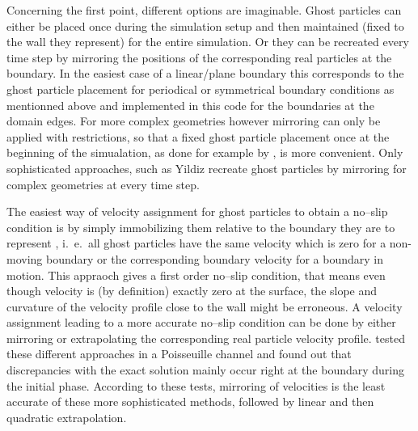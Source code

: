 \documentclass{report}
\begin{document}
Concerning the first point, different options are imaginable. Ghost particles can either be placed once during the simulation setup and then maintained (fixed to the wall they represent) for the entire simulation. Or they can be recreated every time step by mirroring the positions of the corresponding real particles at the boundary. In the easiest case of a linear/plane boundary this corresponds to the ghost particle placement for periodical or symmetrical boundary conditions as mentionned above and implemented in this code for the boundaries at the domain edges.
For more complex geometries however mirroring can only be applied with restrictions, so that a fixed ghost particle placement once at the beginning of the simualation, as done for example by \cite{Morris1997, Zhu1999}, is more convenient. Only sophisticated approaches, such as Yildiz \cite{Yildiz2009} recreate ghost particles by mirroring for complex geometries at every time step.

The easiest way of velocity assignment for ghost particles to obtain a no--slip condition is by simply immobilizing them relative to the boundary they are to represent \cite{Morris1997}, i.\ e.\ all ghost particles have the same velocity which is zero for a non-moving boundary or the corresponding boundary velocity for a boundary in motion. This appraoch gives a first order 
no--slip condition, that means even though velocity is (by definition) exactly zero at the surface, the slope and curvature of the velocity profile close to the wall might be erroneous.  A velocity assignment leading to a more accurate no--slip condition can be done by either mirroring or extrapolating the corresponding real particle velocity profile. \cite{Basa2009} tested these different approaches in a Poisseuille channel and found out that discrepancies with the exact solution mainly occur right at the boundary during the initial phase.  According to these tests, mirroring of velocities is the least accurate of these more sophisticated methods, followed by linear and then quadratic extrapolation. 
\end{document}
